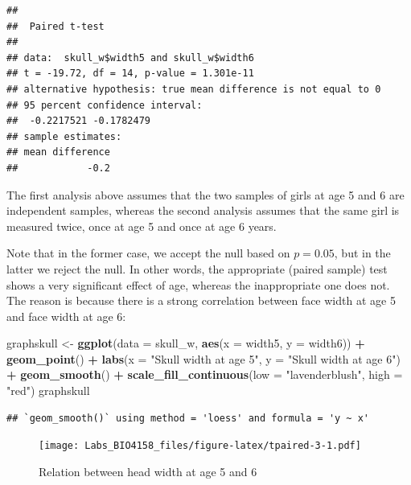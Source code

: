 \documentclass[
  12pt,
]{book}
\newenvironment{Shaded}{\begin{snugshade}}{\end{snugshade}}
\newcommand{\DataTypeTok}[1]{\textcolor[rgb]{0.13,0.29,0.53}{#1}}
\newcommand{\KeywordTok}[1]{\textcolor[rgb]{0.13,0.29,0.53}{\textbf{#1}}}
\newcommand{\NormalTok}[1]{#1}
\newcommand{\OperatorTok}[1]{\textcolor[rgb]{0.81,0.36,0.00}{\textbf{#1}}}
\newcommand{\StringTok}[1]{\textcolor[rgb]{0.31,0.60,0.02}{#1}}
\begin{document}
\begin{verbatim}
## 
##  Paired t-test
## 
## data:  skull_w$width5 and skull_w$width6
## t = -19.72, df = 14, p-value = 1.301e-11
## alternative hypothesis: true mean difference is not equal to 0
## 95 percent confidence interval:
##  -0.2217521 -0.1782479
## sample estimates:
## mean difference 
##            -0.2
\end{verbatim}

The first analysis above assumes that the two samples of girls at age 5 and 6 are independent samples, whereas the second analysis assumes that the same girl is measured twice, once at age 5 and once at age 6 years.

Note that in the former case, we accept the null based on \(p = 0.05\), but in the latter we reject the null. In other words, the appropriate (paired sample) test shows a very significant effect of age, whereas the inappropriate one does not. The reason is because there is a strong correlation between face width at age 5 and face width at age 6:

\begin{Shaded}
\begin{Highlighting}[]
\NormalTok{graphskull \textless{}{-}}\StringTok{ }\KeywordTok{ggplot}\NormalTok{(}\DataTypeTok{data =}\NormalTok{ skull\_w, }\KeywordTok{aes}\NormalTok{(}\DataTypeTok{x =}\NormalTok{ width5, }\DataTypeTok{y =}\NormalTok{ width6)) }\OperatorTok{+}
\StringTok{  }\KeywordTok{geom\_point}\NormalTok{() }\OperatorTok{+}
\StringTok{  }\KeywordTok{labs}\NormalTok{(}\DataTypeTok{x =} \StringTok{"Skull width at age 5"}\NormalTok{, }\DataTypeTok{y =} \StringTok{"Skull width at age 6"}\NormalTok{) }\OperatorTok{+}
\StringTok{  }\KeywordTok{geom\_smooth}\NormalTok{() }\OperatorTok{+}
\StringTok{  }\KeywordTok{scale\_fill\_continuous}\NormalTok{(}\DataTypeTok{low =} \StringTok{"lavenderblush"}\NormalTok{, }\DataTypeTok{high =} \StringTok{"red"}\NormalTok{)}
\NormalTok{graphskull}
\end{Highlighting}
\end{Shaded}

\begin{verbatim}
## `geom_smooth()` using method = 'loess' and formula = 'y ~ x'
\end{verbatim}

\begin{figure}
\centering
\texttt{[image: Labs\_BIO4158\_files/figure-latex/tpaired-3-1.pdf]}
\caption{\label{fig:tpaired-3}Relation between head width at age 5 and 6}
\end{figure}
\end{document}
